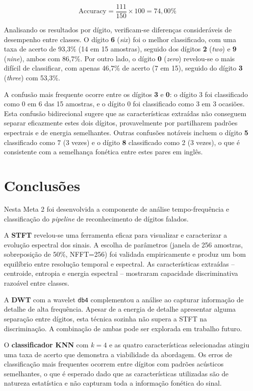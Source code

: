 \documentclass[12pt]{article}
\begin{document}
\[
\text{Accuracy} = \frac{111}{150} \times 100 = 74{,}00\%
\]

Analisando os resultados por dígito, verificam-se diferenças consideráveis de desempenho entre
classes. O dígito \textbf{6} (\textit{six}) foi o melhor classificado, com uma taxa de acerto de
93,3\% (14 em 15 amostras), seguido dos dígitos \textbf{2} (\textit{two}) e \textbf{9}
(\textit{nine}), ambos com 86,7\%. Por outro lado, o dígito \textbf{0} (\textit{zero}) revelou-se
o mais difícil de classificar, com apenas 46,7\% de acerto (7 em 15), seguido do dígito \textbf{3}
(\textit{three}) com 53,3\%.

A confusão mais frequente ocorre entre os dígitos \textbf{3} e \textbf{0}: o dígito 3 foi
classificado como 0 em 6 das 15 amostras, e o dígito 0 foi classificado como 3 em 3 ocasiões.
Esta confusão bidirecional sugere que as características extraídas não conseguem separar
eficazmente estes dois dígitos, provavelmente por partilharem padrões espectrais e de energia
semelhantes. Outras confusões notáveis incluem o dígito \textbf{5} classificado como 7 (3 vezes)
e o dígito \textbf{8} classificado como 2 (3 vezes), o que é consistente com a semelhança
fonética entre estes pares em inglês.

\section{Conclusões}

Nesta Meta 2 foi desenvolvida a componente de análise tempo-frequência e classificação do
\textit{pipeline} de reconhecimento de dígitos falados.

A \textbf{STFT} revelou-se uma ferramenta eficaz para visualizar e caracterizar a evolução
espectral dos sinais. A escolha de parâmetros (janela de 256 amostras, sobreposição de 50\%,
NFFT=256) foi validada empiricamente e produz um bom equilíbrio entre resolução temporal e
espectral. As características extraídas -- centroide, entropia e energia espectral -- mostraram
capacidade discriminativa razoável entre classes.

A \textbf{DWT} com a wavelet \texttt{db4} complementou a análise ao capturar informação de
detalhe de alta frequência. Apesar de a energia de detalhe apresentar alguma separação entre
dígitos, esta técnica sozinha não supera a STFT na discriminação. A combinação de ambas pode
ser explorada em trabalho futuro.

O \textbf{classificador KNN} com $k=4$ e as quatro características selecionadas atingiu uma taxa
de acerto que demonstra a viabilidade da abordagem. Os erros de classificação mais frequentes
ocorrem entre dígitos com padrões acústicos semelhantes, o que é esperado dado que as
características utilizadas são de natureza estatística e não capturam toda a informação fonética
do sinal.
\end{document}
